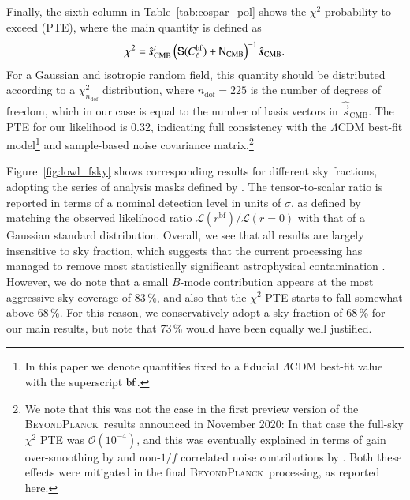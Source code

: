 \documentclass[onecolumn]{aa}
\newcommand{\s}[0]{\vec{s}}
\newcommand{\N}[0]{\tens{N}}
\renewcommand{\S}[0]{\tens{S}}
\newcommand{\BP}{\textsc{BeyondPlanck}}
\begin{document}
Finally, the sixth column in Table~\ref{tab:cospar_pol} shows the $\chi^2$
probability-to-exceed (PTE), where the main quantity is defined as
\begin{equation}
  \chi^2 = \hat{\s}_{\mathrm{CMB}}^t
  \left(\S(C_{\ell}^{\mathrm{bf}})+\N_{\mathrm{CMB}}\right)^{-1}\hat{\s}_{\mathrm{CMB}}.
\end{equation}
For a Gaussian and isotropic random field, this quantity should be
distributed according to a $\chi^2_{n_{\mathrm{dof}}}$ distribution,
where $n_{\mathrm{dof}}=225$ is the number of degrees of freedom,
which in our case is equal to the number of basis vectors in
$\hat{\s}_{\mathrm{CMB}}$. The PTE for our likelihood is 0.32,
indicating full consistency with the $\Lambda$CDM best-fit model\footnote{
In this paper we denote quantities fixed to a fiducial $\Lambda$CDM best-fit 
value with the superscript $\rm{bf}$.} 
and sample-based noise covariance matrix.\footnote{We note that this was
  not the case in the first preview version of the \BP\ results
  announced in November 2020: In that case the full-sky $\chi^2$ PTE
  was $\mathcal{O}(10^{-4})$, and this was eventually explained in
  terms of gain over-smoothing by \citet{bp07} and non-$1/f$
  correlated noise contributions by \citet{bp06}. Both these effects
  were mitigated in the final \BP\ processing, as reported here.}

Figure~\ref{fig:lowl_fsky} shows corresponding results for different
sky fractions, adopting the series of analysis masks defined by \citet{planck2016-l05}. The
tensor-to-scalar ratio is reported in terms of a nominal detection
level in units of $\sigma$, as defined by matching the observed
likelihood ratio $\mathcal{L}(r^{\mathrm{bf}})/\mathcal{L}(r=0)$ with
that of a Gaussian standard distribution. Overall, we see that all
results are largely insensitive to sky fraction, which suggests that
the current processing has managed to remove most statistically
significant astrophysical contamination \citep{bp13,bp14}. However, we do
note that a small $B$-mode contribution appears at the most aggressive
sky coverage of 83\,\%, and also that the $\chi^2$ PTE starts to fall
somewhat above 68\,\%. For this reason, we conservatively adopt a sky
fraction of 68\,\% for our main results, but note that 73\,\% would
have been equally well justified. 
\end{document}
